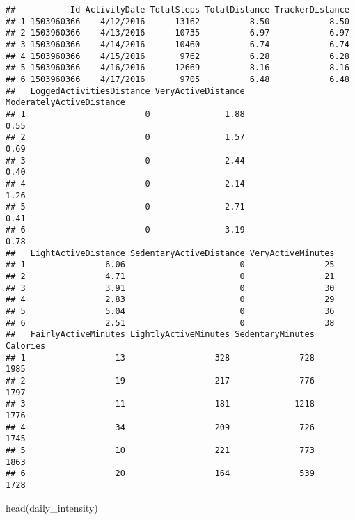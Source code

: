 \documentclass[
]{article}
\newenvironment{Shaded}{\begin{snugshade}}{\end{snugshade}}
\newcommand{\FunctionTok}[1]{\textcolor[rgb]{0.00,0.00,0.00}{#1}}
\newcommand{\NormalTok}[1]{#1}
\begin{document}
\begin{verbatim}
##           Id ActivityDate TotalSteps TotalDistance TrackerDistance
## 1 1503960366    4/12/2016      13162          8.50            8.50
## 2 1503960366    4/13/2016      10735          6.97            6.97
## 3 1503960366    4/14/2016      10460          6.74            6.74
## 4 1503960366    4/15/2016       9762          6.28            6.28
## 5 1503960366    4/16/2016      12669          8.16            8.16
## 6 1503960366    4/17/2016       9705          6.48            6.48
##   LoggedActivitiesDistance VeryActiveDistance ModeratelyActiveDistance
## 1                        0               1.88                     0.55
## 2                        0               1.57                     0.69
## 3                        0               2.44                     0.40
## 4                        0               2.14                     1.26
## 5                        0               2.71                     0.41
## 6                        0               3.19                     0.78
##   LightActiveDistance SedentaryActiveDistance VeryActiveMinutes
## 1                6.06                       0                25
## 2                4.71                       0                21
## 3                3.91                       0                30
## 4                2.83                       0                29
## 5                5.04                       0                36
## 6                2.51                       0                38
##   FairlyActiveMinutes LightlyActiveMinutes SedentaryMinutes Calories
## 1                  13                  328              728     1985
## 2                  19                  217              776     1797
## 3                  11                  181             1218     1776
## 4                  34                  209              726     1745
## 5                  10                  221              773     1863
## 6                  20                  164              539     1728
\end{verbatim}

\begin{Shaded}
\begin{Highlighting}[]
\FunctionTok{head}\NormalTok{(daily\_intensity)}
\end{Highlighting}
\end{Shaded}
\end{document}
